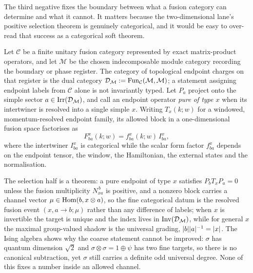 The third negative fixes the boundary between what a fusion category can
determine and what it cannot. It matters because the two-dimensional lane's
positive selection theorem is genuinely categorical, and it would be easy to
over-read that success as a categorical soft theorem.

\begin{definition}
\label{def:endpoint-register}
Let $\mathcal{C}$ be a finite unitary fusion category represented by exact
matrix-product operators, and let $\mathcal{M}$ be the chosen indecomposable
module category recording the boundary or phase register. The category of
topological endpoint charges on that register is the dual category
$\mathcal{D}_{\mathcal{M}} := \operatorname{Fun}_{\mathcal{C}}(\mathcal{M},\mathcal{M})$; a statement
assigning endpoint labels from $\mathcal{C}$ alone is not invariantly typed. Let
$P_a$ project onto the simple sector $a \in \operatorname{Irr}(\mathcal{D}_{\mathcal{M}})$, and call an
endpoint operator \emph{pure of type $x$} when its intertwiner is resolved into
a single simple $x$. Writing $T_x(k;w)$ for a windowed, momentum-resolved
endpoint family, its allowed block in a one-dimensional fusion space
factorises as
\begin{equation}
  F^{x}_{ba}(k;w) = f^{x}_{ba}(k;w)\,I^{x}_{ba},
  \label{eq:endpoint-formfactor}
\end{equation}
where the intertwiner $I^{x}_{ba}$ is categorical while the scalar form factor
$f^{x}_{ba}$ depends on the endpoint tensor, the window, the Hamiltonian, the
external states and the normalisation.
\end{definition}

The selection half is a theorem: a pure endpoint of type $x$ satisfies
$P_b T_x P_a = 0$ unless the fusion multiplicity $N_{xa}^{\,b}$ is positive,
and a nonzero block carries a channel vector $\mu \in \operatorname{Hom}(b, x \otimes a)$, so
the fine categorical datum is the resolved fusion event $(x,a\to b;\mu)$ rather
than any difference of labels; when $x$ is invertible the target is unique and
the index lives in $\operatorname{Inv}(\mathcal{D}_{\mathcal{M}})$, while for general $x$ the maximal
group-valued shadow is the universal grading, $\lvert b\rvert\lvert a\rvert^{-1} = \lvert x\rvert$.
The Ising algebra shows why the coarse statement cannot be improved: $\sigma$
has quantum dimension $\sqrt2$ and $\sigma \otimes \sigma = 1 \oplus \psi$ has
two fine targets, so there is no canonical subtraction, yet $\sigma$ still
carries a definite odd universal degree. None of this fixes a number inside an
allowed channel.

